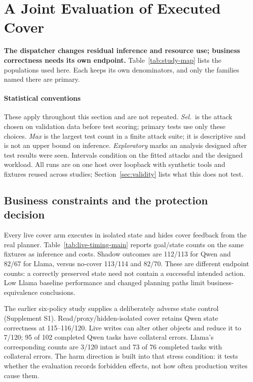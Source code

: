 \section{A Joint Evaluation of Executed Cover}\label{sec:experiment}
\textbf{The dispatcher changes residual inference and resource use; business correctness needs its own endpoint.}
Table~\ref{tab:study-map} lists the populations used here. Each keeps its own denominators, and only the families named there are primary.



\paragraph{Statistical conventions}
These apply throughout this section and are not repeated. \emph{Sel.}\ is the attack chosen on validation data before test scoring; primary tests use only these choices. \emph{Max} is the largest test count in a finite attack suite; it is descriptive and is not an upper bound on inference. \emph{Exploratory} marks an analysis designed after test results were seen. Intervals condition on the fitted attacks and the designed workload. All runs are on one host over loopback with synthetic tools and fixtures reused across studies; Section~\ref{sec:validity} lists what this does not test.




\subsection{Business constraints and the protection decision}\label{sec:business}
Every live cover arm executes in isolated state and hides cover feedback from the real planner. Table~\ref{tab:live-timing-main} reports goal/state counts on the same fixtures as inference and costs. Shadow outcomes are 112/113 for Qwen and 82/67 for Llama, versus no-cover 113/114 and 82/70. These are different endpoint counts: a correctly preserved state need not contain a successful intended action. Low Llama baseline performance and changed planning paths limit business-equivalence conclusions.

The earlier six-policy study supplies a deliberately adverse state control (Supplement S1). Read/proxy/hidden-isolated cover retains Qwen state correctness at 115--116/120. Live writes can alter other objects and reduce it to 7/120; 95 of 102 completed Qwen tasks have collateral errors. Llama's corresponding counts are 3/120 intact and 73 of 76 completed tasks with collateral errors. The harm direction is built into that stress condition: it tests whether the evaluation records forbidden effects, not how often production writes cause them.

